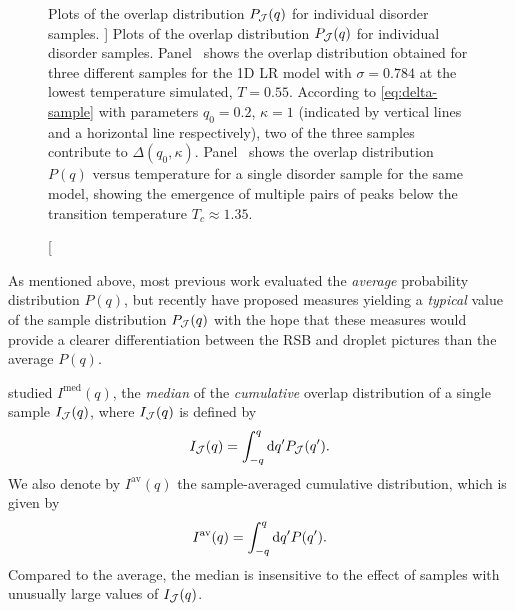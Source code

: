 \begin{figure}
  \centering
  \begin{subfigure}{0.49\textwidth}
    \centering
    
    \subcaption{}\label{fig:sample-overlaps-Tmin}
  \end{subfigure}
  \begin{subfigure}{0.49\textwidth}
    \centering
    
    \subcaption{}\label{fig:sample-overlap}
  \end{subfigure}
  \caption
  [
    Plots of the overlap distribution $P_{\mathcal{J}}(q)$ for individual disorder
    samples.
  ]
  {
    Plots of the overlap distribution $P_{\mathcal{J}}(q)$ for individual disorder
    samples. Panel~ shows the overlap
    distribution obtained for three different samples for the 1D LR model with
    $\sigma=0.784$ at the lowest temperature simulated, $T=0.55$. According to
    \cref{eq:delta-sample} with parameters $q_0=0.2$, $\kappa=1$ (indicated by
    vertical lines and a horizontal line respectively), two of the three
    samples contribute to $\Delta(q_0,\kappa)$.
    Panel~ shows the overlap distribution $P(q)$
    versus temperature for a single disorder sample for the same model, showing
    the emergence of multiple pairs of peaks below the transition temperature
    $T_c \approx 1.35$.
  }
\end{figure}

As mentioned above, most previous work evaluated the \emph{average} probability
distribution $P(q)$, but recently
\textcite{middleton2013extracting,monthus2013typical}
have proposed measures yielding a \emph{typical} value of the sample
distribution $P_{\mathcal{J}}(q)$ with the hope that these measures would provide a
clearer differentiation between the RSB and droplet pictures than the average
$P(q)$.

\textcite{middleton2013extracting} studied $I^{\mathrm{med}}(q)$, the
\emph{median} of the \emph{cumulative} overlap distribution of a single sample
$I_{\mathcal{J}}(q)$, where $I_{\mathcal{J}}(q)$ is defined by
\begin{equation}
  I_{\mathcal{J}}(q) = \int_{-q}^q \mathop{}\!\mathrm{d} q^{\prime} P_{\mathcal{J}}(q^{\prime}).
\end{equation}
We also denote by $I^{\mathrm{av}}(q)$ the sample-averaged cumulative
distribution, which is given by
\begin{equation}
  I^{\mathrm{av}}(q) = \int_{-q}^q \mathop{}\!\mathrm{d} q^{\prime} P(q^{\prime}).
  \label{eq:Iav}
\end{equation}
Compared to the average, the median is insensitive to the effect of samples
with unusually large values of $I_{\mathcal{J}}(q)$.

